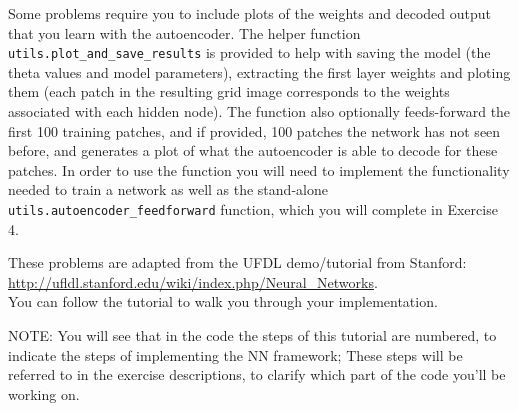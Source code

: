 \documentclass[10pt]{article}
\begin{document}
Some problems require you to include plots of the weights and decoded output that you learn with the autoencoder.  The helper function {\tt utils.plot\_and\_save\_results} is provided to help with saving the model (the theta values and model parameters), extracting the first layer weights and ploting them (each patch in the resulting grid image corresponds to the weights associated with each hidden node).  The function also optionally feeds-forward the first 100 training patches, and if provided, 100 patches the network has not seen before, and generates a plot of what the autoencoder is able to decode for these patches.  In order to use the function you will need to implement the functionality needed to train a network as well as the stand-alone {\tt utils.autoencoder\_feedforward} function, which you will complete in Exercise 4.

These problems are adapted from the UFDL demo/tutorial from Stanford:\\
\url{http://ufldl.stanford.edu/wiki/index.php/Neural_Networks}. \\
You can follow the tutorial to walk you through your implementation.

NOTE: You will see that in the code the steps of this tutorial are numbered, to indicate the steps of implementing the NN framework; These steps will be referred to in the exercise descriptions, to clarify which part of the code you'll be working on.

\vspace{.5cm}

\end{document}
